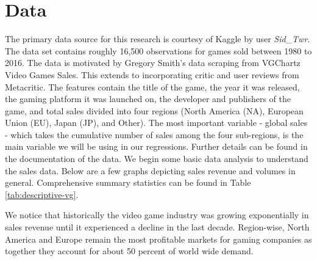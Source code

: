 \documentclass[12pt,english]{article}
\begin{document}
\section{Data}\label{sec:data}
The primary data source for this research is courtesy of Kaggle by user \textit{Sid\_Twr}. The data set contains roughly 16,500 observations for games sold between 1980 to 2016. The data is motivated by Gregory Smith's data scraping from VGChartz Video Games Sales. This extends to incorporating critic and user reviews from Metacritic. The features contain the title of the game, the year it was released, the gaming platform it was launched on, the developer and publishers of the game, and total sales divided into four regions (North America (NA), European Union (EU), Japan (JP), and Other). The most important variable - global sales - which takes the cumulative number of sales among the four sub-regions, is the main variable we will be using in our regressions. Further details can be found in the documentation of the data. We begin some basic data analysis to understand the sales data. Below are a few graphs depicting sales revenue and volumes in general. Comprehensive summary statistics can be found in Table \ref{tab:descriptive-vg}.

We notice that historically the video game industry was growing exponentially in sales revenue until it experienced a decline in the last decade. Region-wise, North America and Europe remain the most profitable markets for gaming companies as together they account for about 50 percent of world wide demand. 
\end{document}
